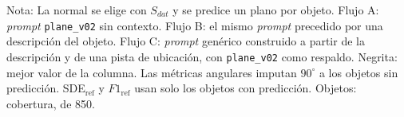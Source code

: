 \begin{table}[htbp]
\vspace{1.5ex}
\begin{minipage}{\wd\tablebox}
\footnotesize
Nota: La normal se elige con $S_{dat}$ y se predice un plano por objeto. Flujo A: \textit{prompt} \texttt{plane\_v02} sin contexto. Flujo B: el mismo \textit{prompt} precedido por una descripción del objeto. Flujo C: \textit{prompt} genérico construido a partir de la descripción y de una pista de ubicación, con \texttt{plane\_v02} como respaldo. Negrita: mejor valor de la columna. Las métricas angulares imputan $90^\circ$ a los objetos sin predicción. SDE$_{\mathrm{ref}}$ y $F1_{\mathrm{ref}}$ usan solo los objetos con predicción. Objetos: cobertura, de 850.
\end{minipage}
\end{table}

\clearpage


